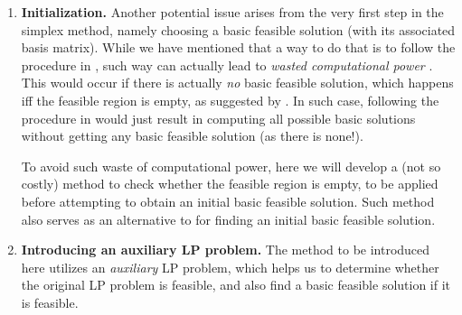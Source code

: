 \begin{enumerate}
\item \textbf{Initialization.} Another potential issue arises from the very
first step in the simplex method, namely choosing a basic feasible solution
(with its associated basis matrix). While we have mentioned that a way to do
that is to follow the procedure in , such
way can actually lead to \emph{wasted computational power} .
This would occur if there is actually \emph{no} basic feasible solution, which
happens iff the feasible region is empty, as suggested by
. In such case, following the procedure in
 would just result in computing all
possible basic solutions without getting any basic feasible solution (as there
is none!).

To avoid such waste of computational power, here we will develop a (not so
costly) method to check whether the feasible region is empty, to be applied
before attempting to obtain an initial basic feasible solution. Such method
also serves as an alternative to  for
finding an initial basic feasible solution.

\item \textbf{Introducing an auxiliary LP problem.} The method
to be introduced here utilizes an \emph{auxiliary} LP problem, which helps us
to determine whether the original LP problem is feasible,
and also find a basic feasible solution if it is feasible.


\end{enumerate}
